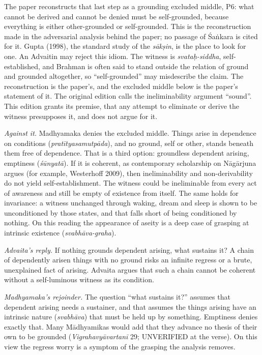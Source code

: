 \documentclass[11pt]{article}
\begin{document}
The paper reconstructs that last step as a grounding excluded middle, P6: what cannot be derived and cannot be denied must be self-grounded, because everything is either other-grounded or self-grounded. This is the reconstruction made in the adversarial analysis behind the paper; no passage of Śaṅkara is cited for it. Gupta (1998), the standard study of the \emph{sākṣin}, is the place to look for one. An Advaitin may reject this idiom. The witness is \emph{svataḥ-siddha}, self-established, and Brahman is often said to stand outside the relation of ground and grounded altogether, so ``self-grounded'' may misdescribe the claim. The reconstruction is the paper's, and the excluded middle below is the paper's statement of it. The original edition calls the ineliminability argument ``sound''. This edition grants its premise, that any attempt to eliminate or derive the witness presupposes it, and does not argue for it.

\emph{Against it.} Madhyamaka denies the excluded middle. Things arise in dependence on conditions (\emph{pratītyasamutpāda}), and no ground, self or other, stands beneath them free of dependence. That is a third option: groundless dependent arising, emptiness (\emph{śūnyatā}). If it is coherent, as contemporary scholarship on Nāgārjuna argues (for example, Westerhoff 2009), then ineliminability and non-derivability do not yield self-establishment. The witness could be ineliminable from every act of awareness and still be empty of existence from itself. The same holds for invariance: a witness unchanged through waking, dream and sleep is shown to be unconditioned by those states, and that falls short of being conditioned by nothing. On this reading the appearance of aseity is a deep case of grasping at intrinsic existence (\emph{svabhāva-graha}).

\emph{Advaita's reply.} If nothing grounds dependent arising, what sustains it? A chain of dependently arisen things with no ground risks an infinite regress or a brute, unexplained fact of arising. Advaita argues that such a chain cannot be coherent without a self-luminous witness as its condition.

\emph{Madhyamaka's rejoinder.} The question ``what sustains it?'' assumes that dependent arising needs a sustainer, and that assumes the things arising have an intrinsic nature (\emph{svabhāva}) that must be held up by something. Emptiness denies exactly that. Many Mādhyamikas would add that they advance no thesis of their own to be grounded (\emph{Vigrahavyāvartanī} 29; UNVERIFIED at the verse). On this view the regress worry is a symptom of the grasping the analysis removes.
\end{document}
